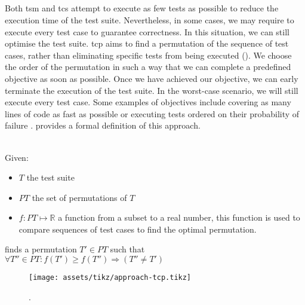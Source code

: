 
\subsection{\tcp{}}
Both \acrshort{tsm} and \acrshort{tcs} attempt to execute as few tests as possible to reduce the execution time of the test suite. Nevertheless, in some cases, we may require to execute every test case to guarantee correctness. In this situation, we can still optimise the test suite. \acrfull{tcp} aims to find a permutation of the sequence of test cases, rather than eliminating specific tests from being executed (). We choose the order of the permutation in such a way that we can complete a predefined objective as soon as possible. Once we have achieved our objective, we can early terminate the execution of the test suite. In the worst-case scenario, we will still execute every test case. Some examples of objectives include covering as many lines of code as fast as possible or executing tests ordered on their probability of failure \cite{10.1002/stv.430}.  provides a formal definition of this approach.

\begin{definition}[\tcp{}]
\label{def:tcp}
\mbox{}\\Given:
\begin{itemize}
	\item $T$ the test suite
	\item $PT$ the set of permutations of $T$
	\item $f: PT \mapsto \mathbb{R}$ a function from a subset to a real number, this function is used to compare sequences of test cases to find the optimal permutation.
\end{itemize}

\noindent \tcp{} finds a permutation $T' \in PT$ such that $\forall T'' \in PT : f(T') \ge f(T'') \Rightarrow (T'' \ne T')$ 
\end{definition}

\begin{figure}[htbp!]
	\centering
	\texttt{[image: assets/tikz/approach-tcp.tikz]}
	\caption{\tcp{}.}
	\label{fig:tcp}
\end{figure}